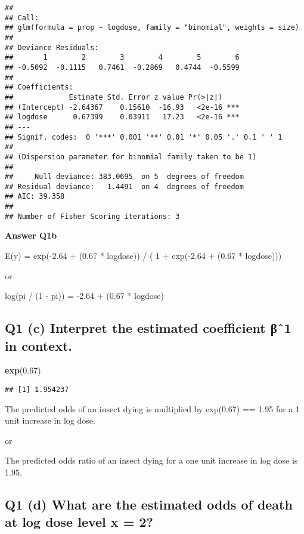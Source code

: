 \documentclass[
]{article}
\newenvironment{Shaded}{\begin{snugshade}}{\end{snugshade}}
\newcommand{\FloatTok}[1]{\textcolor[rgb]{0.00,0.00,0.81}{#1}}
\newcommand{\KeywordTok}[1]{\textcolor[rgb]{0.13,0.29,0.53}{\textbf{#1}}}
\newcommand{\NormalTok}[1]{#1}
\begin{document}
\begin{verbatim}
## 
## Call:
## glm(formula = prop ~ logdose, family = "binomial", weights = size)
## 
## Deviance Residuals: 
##       1        2        3        4        5        6  
## -0.5092  -0.1115   0.7461  -0.2869   0.4744  -0.5599  
## 
## Coefficients:
##             Estimate Std. Error z value Pr(>|z|)    
## (Intercept) -2.64367    0.15610  -16.93   <2e-16 ***
## logdose      0.67399    0.03911   17.23   <2e-16 ***
## ---
## Signif. codes:  0 '***' 0.001 '**' 0.01 '*' 0.05 '.' 0.1 ' ' 1
## 
## (Dispersion parameter for binomial family taken to be 1)
## 
##     Null deviance: 383.0695  on 5  degrees of freedom
## Residual deviance:   1.4491  on 4  degrees of freedom
## AIC: 39.358
## 
## Number of Fisher Scoring iterations: 3
\end{verbatim}

\textbf{Answer Q1b}

E(y) = exp(-2.64 + (0.67 * logdose)) / ( 1 + exp(-2.64 + (0.67 *
logdose)))

or

log(pi / (1 - pi)) = -2.64 + (0.67 * logdose)

\hypertarget{q1-c-interpret-the-estimated-coefficient-ux3b2ux2c61-in-context.}{%
\subsection{Q1 (c) Interpret the estimated coefficient βˆ1 in
context.}\label{q1-c-interpret-the-estimated-coefficient-ux3b2ux2c61-in-context.}}

\begin{Shaded}
\begin{Highlighting}[]
\KeywordTok{exp}\NormalTok{(}\FloatTok{0.67}\NormalTok{)}
\end{Highlighting}
\end{Shaded}

\begin{verbatim}
## [1] 1.954237
\end{verbatim}

The predicted odds of an insect dying is multiplied by exp(0.67) == 1.95
for a 1 unit increase in log dose.

or

The predicted odds ratio of an insect dying for a one unit increase in
log dose is 1.95.

\hypertarget{q1-d-what-are-the-estimated-odds-of-death-at-log-dose-level-x-2}{%
\subsection{Q1 (d) What are the estimated odds of death at log dose
level x =
2?}\label{q1-d-what-are-the-estimated-odds-of-death-at-log-dose-level-x-2}}
\end{document}
